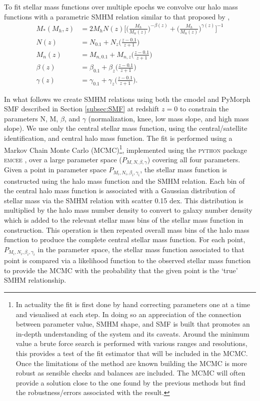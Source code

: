 To fit stellar mass functions over multiple epochs we convolve our halo mass functions with a parametric SMHM relation similar to that proposed by \cite{Moster2010},
\begin{equation}
\label{eqn:MosAbn}
\begin{split}
M_*(M_h, z) &= 2M_hN(z)\Big[ \Big( \frac{M_h}{M_{n}(z)}\Big) ^{- \beta(z)} + \Big( \frac{M_h}{M_{n}(z)}\Big)^{\gamma(z)} \Big ]^{-1}\\
N(z) &= N_{0.1} +N_z\Big(\frac{z-0.1}{z+1}\Big)\\
M_{n}(z) &= M_{n,0.1} +M_{n,z}\Big(\frac{z-0.1}{z+1}\Big)\\
\beta(z) &= \beta_{0.1} +\beta_z\Big(\frac{z-0.1}{z+1}\Big)\\
\gamma(z) &= \gamma_{0.1} +\gamma_z\Big(\frac{z-0.1}{z+1}\Big).
\end{split}
\end{equation}

In what follows we create SMHM relations using both the cmodel and PyMorph SMF described in Section \ref{subsec:SMF} at redshift $z=0$ to constrain the parameters N, M, $\beta$, and $\gamma$ (normalization, knee, low mass slope, and high mass slope). We use only the central stellar mass function, using the \cite{Yang2012EvolutionHalos} central/satellite identification, and central halo mass function. The fit is performed using a Markov Chain Monte Carlo (MCMC)\footnote{In actuality the fit is first done by hand correcting parameters one at a time and visualised at each step. In doing so an appreciation of the connection between parameter value, SMHM shape, and SMF is built that promotes an in-depth understanding of the system and its caveats. Around the minimum value a brute force search is performed with various ranges and resolutions, this provides a test of the fit estimator that will be included in the MCMC. Once the limitations of the method are known building the MCMC is more robust as sensible checks and balances are included. The MCMC will often provide a solution close to the one found by the previous methods but find the robustness/errors associated with the result.}, implemented using the \textsc{python} package \textsc{emcee} \citep{Foreman-Mackey2013EmceeHammer}, over a large parameter space ($P_{M, N, \beta, \gamma}$) covering all four parameters. Given a point in parameter space $P_{M_i, N_i, \beta_i, \gamma_i}$, the stellar mass function is constructed using the halo mass function and the SMHM relation. Each bin of the central halo mass function is associated with a Gaussian distribution of stellar mass via the SMHM relation with scatter 0.15 dex. This distribution is multiplied by the halo mass number density to convert to galaxy number density which is added to the relevant stellar mass bins of the stellar mass function in construction. This operation is then repeated overall mass bins of the halo mass function to produce the complete central stellar mass function. For each point, $P_{M_i, N_i, \beta_i, \gamma_i}$ in the parameter space, the stellar mass function associated to that point is compared via a likelihood function to the observed stellar mass function to provide the MCMC with the probability that the given point is the `true' SMHM relationship. 

